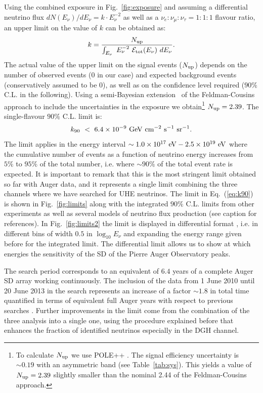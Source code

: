 \documentclass[reprint,showpacs,showkeys,amsmath,amssymb,aps,nofootinbib]{revtex4-1}
\begin{document}
Using the combined exposure in Fig.~\ref{fig:exposure} 
and assuming a differential neutrino flux $dN(E_\nu)/dE_\nu = k\cdot E_\nu^{-2}$ 
as well as a $\nu_e:\nu_\mu:\nu_\tau=1:1:1$ flavour ratio, an upper limit on the value of $k$ can be obtained as:
%
\begin{equation}
k = \frac{N_{\rm up}}{\int_{E_{\nu}}~E_{\nu}^{-2}~{\cal E}_{\rm tot}(E_\nu)~dE_\nu}.
\label{eq:limit}
\end{equation}
% 
The actual value of the upper limit on the signal events ($N_{\rm up}$)
depends on the number of observed events ($0$ in our case) 
and expected background events (conservatively assumed to be $0$), as well
as on the confidence level required ($90\%$ C.L. in the following).
Using a semi-Bayesian extension~\cite{Conrad}
of the Feldman-Cousins approach \cite{Feldman-Cousins} 
to include the uncertainties in the exposure we obtain\footnote{To calculate 
$N_{\rm up}$ we use POLE++ \cite{Conrad}. 
The signal efficiency uncertainty is $\sim 0.19$ with an asymmetric band 
(see Table~\ref{tab:sys}). This yields a value 
of $N_{\rm up}=2.39$ slightly smaller than the nominal 2.44 of 
the Feldman-Cousins approach.} $N_{\rm up}=2.39$.  
The single-flavour $90\%$ C.L. limit is:
%
\begin{equation}
k_{90}~< ~6.4 \times 10^{-9}~{\rm GeV~cm^{-2}~s^{-1}~sr^{-1}}.
\label{eq:k90}
\end{equation}
% 
The limit applies  
in the energy interval $\sim 1.0\times10^{17}~{\rm eV} - 2.5\times10^{19}~{\rm eV}$
where the cumulative number of events as a function of neutrino energy increases 
from $5\%$ to $95\%$ of the total number, i.e. where $\sim 90\%$ of the total 
event rate is expected.
It is important to remark that this is the most stringent limit obtained 
so far with Auger data, and it represents a single limit combining 
the three channels where we have searched for UHE neutrinos.
The limit in Eq.~(\ref{eq:k90}) is shown in Fig.~\ref{fig:limits} along with the integrated 
$90\%$ C.L. limits from other experiments as well as several models of neutrino flux production
(see caption for references). 
In Fig.~\ref{fig:limits2} the limit is displayed in differential format \cite{Anchordoqui}, 
i.e. in different bins of width $0.5$ in $\log_{10}{E_{\nu}}$ and expanding the energy range
given before for the integrated limit.
The differential limit allows us to show at which energies 
the sensitivity of the SD of the Pierre Auger Observatory peaks.

The search period corresponds to an equivalent of $6.4$ years of a complete 
Auger SD array working continuously. The inclusion of the data from 1 June 2010 until 20 June 2013 
in the search represents an increase of a factor $\sim 1.8$ in total time quantified in terms
of equivalent full Auger years with respect to previous 
searches \cite{ES,DGH}. Further improvements in the limit come from the combination of the three
analysis into a single one, using the 
procedure explained before that enhances the fraction of identified neutrinos especially in the DGH channel. 
\end{document}
